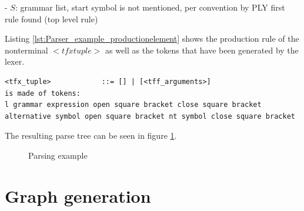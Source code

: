 - $S$: grammar list, start symbol is not mentioned, per convention by \ac{PLY} first rule found (top level rule)

Listing \ref{lst:Parser_example_productionelement} shows the production rule of the nonterminal $<tfx tuple>$ as well as the tokens that have been generated by the lexer.

\begin{lstlisting}[basicstyle=\scriptsize	,caption= Production element,label= lst:Parser_example_productionelement]
<tfx_tuple>            ::= [] | [<tff_arguments>]
is made of tokens:
l grammar expression open square bracket close square bracket alternative symbol open square bracket nt symbol close square bracket
\end{lstlisting}

The resulting parse tree can be seen in figure \ref{fig:ImplementationParsing}. 

\begin{figure}[H]
\caption{Parsing example}
\label{fig:ImplementationParsing}
\end{figure}
                
                
                
\section{Graph generation}\label{sec:ImplementationGraphGeneration}


